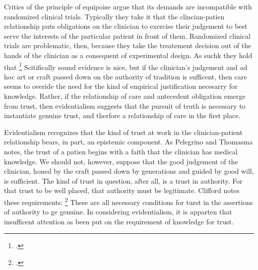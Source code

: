 \documentclass[letterpaper,notitlepage,12pt]{article}
\begin{document}
Critics of the principle of equipoise argue that its demands are incompatible
with randomized clinical trials.
Typically they take it that the clincian-patien relationship puts obligations on
the clinician to exercise their judgement to best serve the interests of the
particular patient in front of them.
Randomized clinical trials are problematic, then, because they take the
treatement decision out of the hands of the clinician as a consequent of
experimental design. As suchk they hold that \footcite[p. 1587]{hellman_mice_1991}
Scitifically sound evidence is nice, but if the clinician's judgement and ad hoc
art or craft passed down on the authority of tradition is sufficent, then care
seems to overide the need for the kind of empirical justification necesarry for
knowledge.
Rather, if the relationship of care and antecedent obligation emerge from trust,
then evidentialism suggests that the pursuit of truth is necessary to
instantiate genuine trust, and therfore a relationship of care in the first
place.

Evidentialism recognizes that the kind of trust at work in the clinician-patient
relationship bears, in part, an epistemic component.
As Pelegrino and Thomasma notes, the trust of a patien begins with a faith that
the clinician has medical knowledge.
We should not, however, suppose that the good judgement of the clinician, honed
by the craft passed down by generations and guided by good will, is sufficient.
The kind of trust in question, after all, is a trust in authority.
For that trust to be well placed, that authority must be legitimate.
Clifford notes these requirements: \footcite[p.
348]{clifford_ethics_1886}
These are all necessary conditions for turst in the assertions of authority to
ge genuine.
In considering evidentialism, it is apparten that insufficent attention as been
put on the requirement of knowledge for trust.
\end{document}
